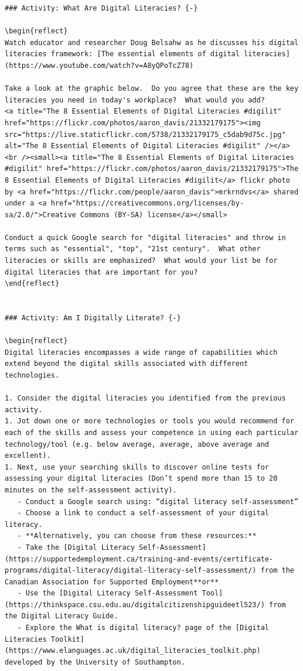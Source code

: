 \documentclass[
]{book}
\theoremstyle{definition}
\theoremstyle{definition}
\theoremstyle{definition}
\theoremstyle{definition}
\theoremstyle{remark}
\begin{document}
\begin{verbatim}
### Activity: What Are Digital Literacies? {-}

\begin{reflect}
Watch educator and researcher Doug Belsahw as he discusses his digital literacies framework: [The essential elements of digital literacies](https://www.youtube.com/watch?v=A8yQPoTcZ78)

Take a look at the graphic below.  Do you agree that these are the key literacies you need in today's workplace?  What would you add?
<a title="The 8 Essential Elements of Digital Literacies #digilit" href="https://flickr.com/photos/aaron_davis/21332179175"><img src="https://live.staticflickr.com/5738/21332179175_c5dab9d75c.jpg" alt="The 8 Essential Elements of Digital Literacies #digilit" /></a><br /><small><a title="The 8 Essential Elements of Digital Literacies #digilit" href="https://flickr.com/photos/aaron_davis/21332179175">The 8 Essential Elements of Digital Literacies #digilit</a> flickr photo by <a href="https://flickr.com/people/aaron_davis">mrkrndvs</a> shared under a <a href="https://creativecommons.org/licenses/by-sa/2.0/">Creative Commons (BY-SA) license</a></small>

Conduct a quick Google search for "digital literacies" and throw in terms such as "essential", "top", "21st century".  What other literacies or skills are emphasized?  What would your list be for digital literacies that are important for you?
\end{reflect}


### Activity: Am I Digitally Literate? {-}

\begin{reflect}
Digital literacies encompasses a wide range of capabilities which extend beyond the digital skills associated with different technologies.

1. Consider the digital literacies you identified from the previous activity.  
1. Jot down one or more technologies or tools you would recommend for each of the skills and assess your competence in using each particular technology/tool (e.g. below average, average, above average and excellent).  
1. Next, use your searching skills to discover online tests for assessing your digital literacies (Don’t spend more than 15 to 20 minutes on the self-assessment activity).  
   - Conduct a Google search using: “digital literacy self-assessment”  
   - Choose a link to conduct a self-assessment of your digital literacy.  
   - **Alternatively, you can choose from these resources:**  
   - Take the [Digital Literacy Self-Assessment](https://supportedemployment.ca/training-and-events/certificate-programs/digital-literacy/digital-literacy-self-assessment/) from the Canadian Association for Supported Employment**or**  
   - Use the [Digital Literacy Self-Assessment Tool](https://thinkspace.csu.edu.au/digitalcitizenshipguideetl523/) from the Digital Literacy Guide.
   - Explore the What is digital literacy? page of the [Digital Literacies Toolkit](https://www.elanguages.ac.uk/digital_literacies_toolkit.php) developed by the University of Southampton.  


\end{verbatim}
\end{document}
